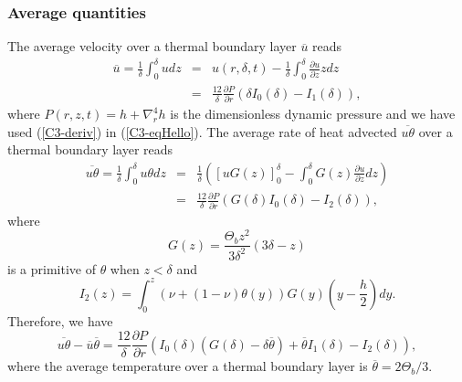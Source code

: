 \subsubsection{Average quantities}
The  average velocity  over  a thermal  boundary layer  $\overline{u}$
reads
\begin{eqnarray}
  \overline{u}        =\frac{1}{\delta}\int_0^{\delta}u dz        &=&
                                                                     u(r,\delta,t) - \frac{1}{\delta}\int_0^{\delta}\frac{\partial
                                                                     u}{\partial
                                                                     z}
                                                                     zdz\label{C3-eqHello}\\
                                                                 &=&\frac{12}{\delta}
                                                                     \frac{\partial
                                                                     P}{\partial
                                                                     r}\left(\delta
                                                                     I_0(\delta)-I_1(\delta)\right),
\end{eqnarray}
where $P(r,z,t) = h+\nabla_r^4h$ is the dimensionless dynamic pressure
and we have used  (\ref{C3-deriv}) in (\ref{C3-eqHello}).  The average
rate  of heat  advected $\overline{u\theta}$  over a  thermal boundary
layer reads
\begin{eqnarray}
  \overline{u\theta}=\frac{1}{\delta}\int_0^{\delta}u\theta dz &=& \frac{1}{\delta}\left( [ uG(z) ]_{0}^{\delta} -\int_0^\delta
                                                                   G(z)\frac{\partial
                                                                   u}{\partial
                                                                   z}
                                                                   dz\right)\nonumber\\
                                                               &=&\frac{12}{\delta} \frac{\partial P}{\partial r}\left(G(\delta)I_0(\delta)-I_2(\delta)\right),
\end{eqnarray}
where
\begin{equation}
  G(z)= \frac{\Theta_{b} z^{2}}{3 \delta^{2}} \left( 3 \delta - z\right)
\end{equation}
is a primitive of $\theta$ when $z<\delta$ and
\begin{equation}
  I_2(z)=\int_0^z\left(\nu+(1-\nu)\theta(y)\right)G(y)
  \left(y-\frac{h}{2}\right)dy.
  \label{C3-I_3}
\end{equation}
Therefore, we have
\begin{equation}
  \overline{u\theta}-\overline{u}\overline{\theta}= \frac{12}{\delta} \frac{\partial P}{\partial r}\left(I_0(\delta)\left(G(\delta)-\delta\overline{\theta}\right)+\overline{\theta}I_1(\delta)-I_2(\delta)\right),
\end{equation} 
where  the  average  temperature  over a  thermal  boundary  layer  is
$ \overline{\theta} = 2\Theta_{b}/3$.


